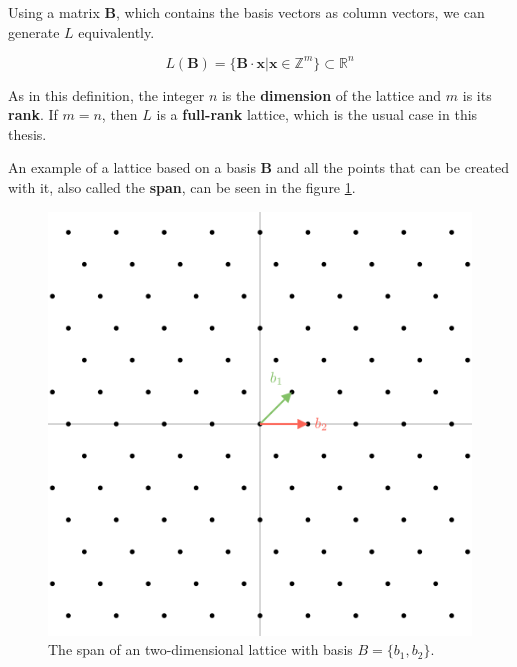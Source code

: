 Using a matrix $\textbf{B}$, which contains the basis vectors as column vectors, we can generate $\textit{L}$ equivalently.

$$L(\textbf{B}) = \{\textbf{B}\cdot\textbf{x} | \textbf{x} \in \mathbb{Z}^m  \} \subset \mathbb{R}^n$$

As in this definition, the integer $n$ is the \textbf{dimension} of the lattice and $m$ is its \textbf{rank}. If $m = n$, then $\textit{L}$ is a \textbf{full-rank} lattice, which is the usual case in this thesis. 

An example of a lattice based on a basis $\textbf{B}$ and all the points that can be created with it, also called the \textbf{span}, can be seen in the figure \ref{fig:latticeGrid}.

\begin{figure}[ht]
  \centering
  \includegraphics[scale=0.2]{images/LatticeGrid.png}
  \caption[Span of an Lattice]{The span of an two-dimensional lattice with basis  $B = \{b_1, b_2\}$.}
  \label{fig:latticeGrid}
\end{figure}



